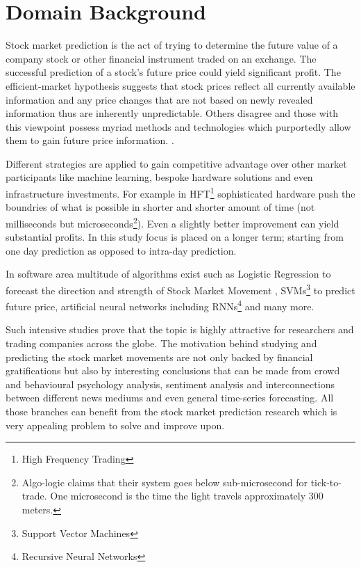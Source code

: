 \section*{Domain Background}

Stock market prediction is the act of trying to determine the future value of a company stock or other financial instrument traded on an exchange. The successful prediction of a stock's future price could yield significant profit. The efficient-market hypothesis suggests that stock prices reflect all currently available information and any price changes that are not based on newly revealed information thus are inherently unpredictable. Others disagree and those with this viewpoint possess myriad methods and technologies which purportedly allow them to gain future price information.
\cite{wiki:sockmarket}.

Different strategies are applied to gain competitive advantage over other market participants like machine learning, bespoke hardware solutions and even infrastructure investments. 
For example in HFT\footnote{High Frequency Trading} sophisticated hardware push the boundries of what is possible in shorter and shorter amount of time (not milliseconds but microseconds\footnote{Algo-logic claims that their system goes below sub-microsecond for tick-to-trade. One microsecond is the time the light travels approximately 300 meters.}). Even a slightly better improvement can yield substantial profits. In this study focus is placed on a longer term; starting from one day prediction as opposed to intra-day prediction. 

In software area multitude of algorithms exist such as
Logistic Regression to forecast the direction and strength of Stock Market Movement \cite{art:ex_linearregression}, 
SVMs\footnote{Support Vector Machines} \cite{art:ex_svm} to predict future price, artificial neural networks  \cite{art:ex_stockann} including RNNs\footnote{Recursive Neural Networks} \cite{art:ex_rnn} and many more.

Such intensive studies prove that the topic is highly attractive for researchers and trading companies across the globe. The motivation behind studying and predicting the stock market movements are not only backed by financial gratifications but also by interesting conclusions that can be made from crowd and behavioural psychology analysis, sentiment analysis and interconnections between different news mediums and even general time-series forecasting. All those branches can benefit from the stock market prediction research which is very appealing problem to solve and improve upon.

